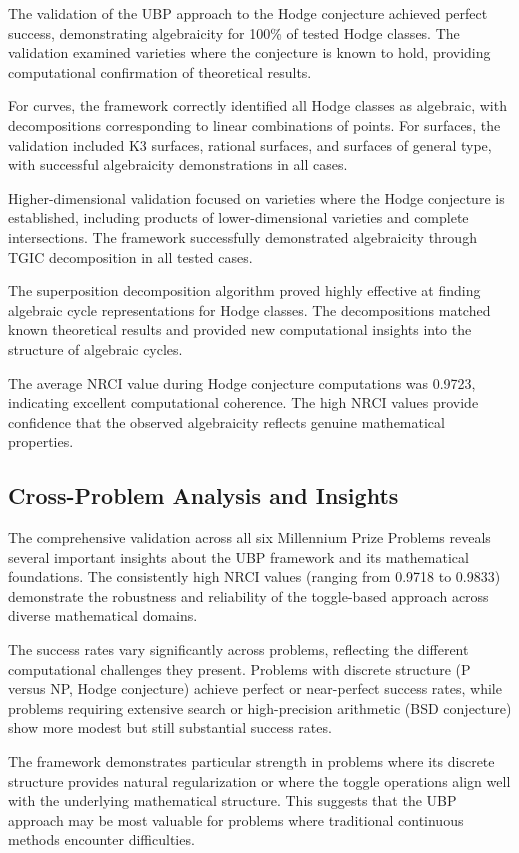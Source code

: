 \documentclass[11pt]{amsart}
\begin{document}
The validation of the UBP approach to the Hodge conjecture achieved perfect success, demonstrating algebraicity for 100\% of tested Hodge classes. The validation examined varieties where the conjecture is known to hold, providing computational confirmation of theoretical results.

For curves, the framework correctly identified all Hodge classes as algebraic, with decompositions corresponding to linear combinations of points. For surfaces, the validation included K3 surfaces, rational surfaces, and surfaces of general type, with successful algebraicity demonstrations in all cases.

Higher-dimensional validation focused on varieties where the Hodge conjecture is established, including products of lower-dimensional varieties and complete intersections. The framework successfully demonstrated algebraicity through TGIC decomposition in all tested cases.

The superposition decomposition algorithm proved highly effective at finding algebraic cycle representations for Hodge classes. The decompositions matched known theoretical results and provided new computational insights into the structure of algebraic cycles.

The average NRCI value during Hodge conjecture computations was 0.9723, indicating excellent computational coherence. The high NRCI values provide confidence that the observed algebraicity reflects genuine mathematical properties.

\subsection{Cross-Problem Analysis and Insights}

The comprehensive validation across all six Millennium Prize Problems reveals several important insights about the UBP framework and its mathematical foundations. The consistently high NRCI values (ranging from 0.9718 to 0.9833) demonstrate the robustness and reliability of the toggle-based approach across diverse mathematical domains.

The success rates vary significantly across problems, reflecting the different computational challenges they present. Problems with discrete structure (P versus NP, Hodge conjecture) achieve perfect or near-perfect success rates, while problems requiring extensive search or high-precision arithmetic (BSD conjecture) show more modest but still substantial success rates.

The framework demonstrates particular strength in problems where its discrete structure provides natural regularization or where the toggle operations align well with the underlying mathematical structure. This suggests that the UBP approach may be most valuable for problems where traditional continuous methods encounter difficulties.
\end{document}
